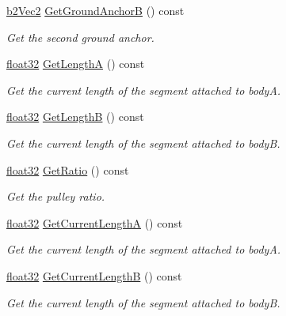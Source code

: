 \begin{DoxyCompactItemize}
\mbox{\hyperlink{structb2_vec2}{b2\+Vec2}} \mbox{\hyperlink{classb2_pulley_joint_afb105270ab46c3fc3f862cab6e127971}{Get\+Ground\+AnchorB}} () const
\begin{DoxyCompactList}\small\item\em Get the second ground anchor. \end{DoxyCompactList}\item 
\mbox{\hyperlink{b2_settings_8h_aacdc525d6f7bddb3ae95d5c311bd06a1}{float32}} \mbox{\hyperlink{classb2_pulley_joint_ac92d5def8d6d14777b255cbeea6b9c30}{Get\+LengthA}} () const
\begin{DoxyCompactList}\small\item\em Get the current length of the segment attached to bodyA. \end{DoxyCompactList}\item 
\mbox{\hyperlink{b2_settings_8h_aacdc525d6f7bddb3ae95d5c311bd06a1}{float32}} \mbox{\hyperlink{classb2_pulley_joint_a8558201dc81ba177f040ec7e12d78c8d}{Get\+LengthB}} () const
\begin{DoxyCompactList}\small\item\em Get the current length of the segment attached to bodyB. \end{DoxyCompactList}\item 
\mbox{\hyperlink{b2_settings_8h_aacdc525d6f7bddb3ae95d5c311bd06a1}{float32}} \mbox{\hyperlink{classb2_pulley_joint_a130e85a48bfe54588d15766b94e3b2b2}{Get\+Ratio}} () const
\begin{DoxyCompactList}\small\item\em Get the pulley ratio. \end{DoxyCompactList}\item 
\mbox{\hyperlink{b2_settings_8h_aacdc525d6f7bddb3ae95d5c311bd06a1}{float32}} \mbox{\hyperlink{classb2_pulley_joint_a4b4f29d81b7d2ffdda5af2f588f49ab6}{Get\+Current\+LengthA}} () const
\begin{DoxyCompactList}\small\item\em Get the current length of the segment attached to bodyA. \end{DoxyCompactList}\item 
\mbox{\hyperlink{b2_settings_8h_aacdc525d6f7bddb3ae95d5c311bd06a1}{float32}} \mbox{\hyperlink{classb2_pulley_joint_aa2d15dc26b2df0a446ccda652058085d}{Get\+Current\+LengthB}} () const
\begin{DoxyCompactList}\small\item\em Get the current length of the segment attached to bodyB. \end{DoxyCompactList}\item 

\end{DoxyCompactItemize}
